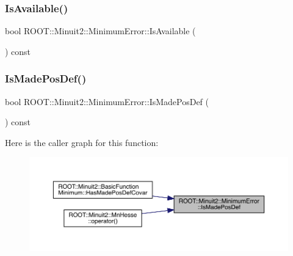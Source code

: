 \subsubsection{\texorpdfstring{IsAvailable()}{IsAvailable()}\hspace{0.1cm}{\footnotesize\ttfamily [2/2]}}
{\footnotesize\ttfamily bool R\+O\+O\+T\+::\+Minuit2\+::\+Minimum\+Error\+::\+Is\+Available (\begin{DoxyParamCaption}{ }\end{DoxyParamCaption}) const\hspace{0.3cm}{\ttfamily [inline]}}

\mbox{\label{classROOT_1_1Minuit2_1_1MinimumError_addbc60edad85c271c20be5ff18678599}} 
\subsubsection{\texorpdfstring{IsMadePosDef()}{IsMadePosDef()}\hspace{0.1cm}{\footnotesize\ttfamily [1/2]}}
{\footnotesize\ttfamily bool R\+O\+O\+T\+::\+Minuit2\+::\+Minimum\+Error\+::\+Is\+Made\+Pos\+Def (\begin{DoxyParamCaption}{ }\end{DoxyParamCaption}) const\hspace{0.3cm}{\ttfamily [inline]}}

Here is the caller graph for this function\+:\nopagebreak
\begin{figure}[H]
\begin{center}
\leavevmode
\includegraphics[width=350pt]{d5/d32/classROOT_1_1Minuit2_1_1MinimumError_addbc60edad85c271c20be5ff18678599_icgraph}
\end{center}
\end{figure}
\mbox{\label{classROOT_1_1Minuit2_1_1MinimumError_addbc60edad85c271c20be5ff18678599}} 
